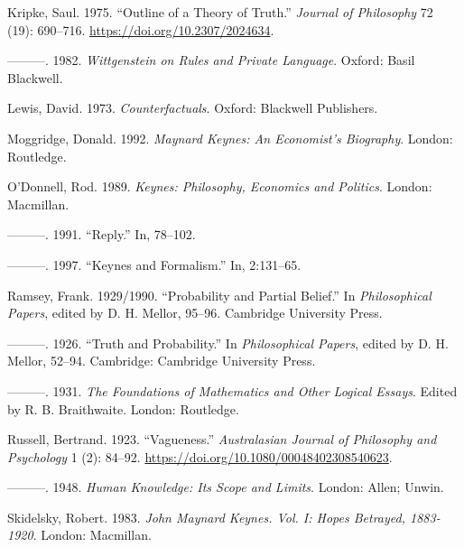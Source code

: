 \documentclass[noflushend]{philosophersimprint}
\newlength{\cslhangindent}
\newenvironment{CSLReferences}[3] %
 {%
  \setlength{\parindent}{0pt}
  \ifodd #1 \everypar{\setlength{\hangindent}{\cslhangindent}}\ignorespaces\fi
  \ifnum #2 > 0
  \setlength{\parskip}{#2\baselineskip}
  \fi
 }%
 {}
\begin{document}
\begin{CSLReferences}{1}{0}
\leavevmode{}%
Kripke, Saul. 1975. {``Outline of a Theory of Truth.''} \emph{Journal of
Philosophy} 72 (19): 690--716. \url{https://doi.org/10.2307/2024634}.

\leavevmode{}%
---------. 1982. \emph{Wittgenstein on Rules and Private Language}.
Oxford: Basil Blackwell.

\leavevmode{}%
Lewis, David. 1973. \emph{Counterfactuals}. Oxford: Blackwell
Publishers.

\leavevmode{}%
Moggridge, Donald. 1992. \emph{Maynard Keynes: An Economist's
Biography}. London: Routledge.

\leavevmode{}%
O'Donnell, Rod. 1989. \emph{Keynes: Philosophy, Economics and Politics}.
London: Macmillan.

\leavevmode{}%
---------. 1991. {``Reply.''} In, 78--102.

\leavevmode{}%
---------. 1997. {``Keynes and Formalism.''} In, 2:131--65.

\leavevmode{}%
Ramsey, Frank. 1929/1990. {``Probability and Partial Belief.''} In
\emph{Philosophical Papers}, edited by D. H. Mellor, 95--96. Cambridge
University Press.

\leavevmode{}%
---------. 1926. {``Truth and Probability.''} In \emph{Philosophical
Papers}, edited by D. H. Mellor, 52--94. Cambridge: Cambridge University
Press.

\leavevmode{}%
---------. 1931. \emph{The Foundations of Mathematics and Other Logical
Essays}. Edited by R. B. Braithwaite. London: Routledge.

\leavevmode{}%
Russell, Bertrand. 1923. {``Vagueness.''} \emph{Australasian Journal of
Philosophy and Psychology} 1 (2): 84--92.
\url{https://doi.org/10.1080/00048402308540623}.

\leavevmode{}%
---------. 1948. \emph{Human Knowledge: Its Scope and Limits}. London:
Allen; Unwin.

\leavevmode{}%
Skidelsky, Robert. 1983. \emph{John Maynard Keynes. Vol. I: Hopes
Betrayed, 1883-1920}. London: Macmillan.


\end{CSLReferences}
\end{document}
